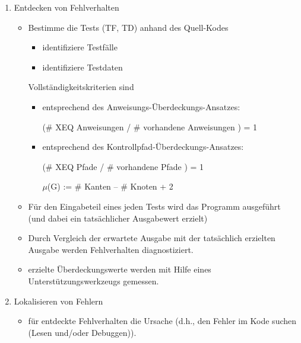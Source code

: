 \begin{enumerate}

\item Entdecken von Fehlverhalten

\begin{itemize}

\item Bestimme die Tests (TF, TD) anhand des Quell-Kodes
\begin{itemize}
\item identifiziere Testf\"alle
\item identifiziere Testdaten
\end{itemize}

Vollst\"andigkeitskriterien sind

\begin{itemize}
\item entsprechend des Anweisungs-\"Uberdeckungs-Ansatzes:

(\# XEQ Anweisungen / \# vorhandene Anweisungen ) =  1

\item entsprechend des Kontrollpfad-\"Uberdeckungs-Ansatzes:

(\# XEQ Pfade / \# vorhandene Pfade ) = 1

$\mu$(G) := \# Kanten -- \# Knoten + 2

\end{itemize}

\item F\"ur den Eingabeteil eines jeden Tests wird das Programm
ausgef\"uhrt (und dabei ein tats\"achlicher Ausgabewert erzielt)

\item Durch Vergleich der erwartete Ausgabe mit der tats\"achlich
erzielten Ausgabe werden Fehlverhalten diagnostiziert.

\item erzielte \"Uberdeckungswerte werden mit Hilfe eines
Unterst\"utzungswerkzeugs gemessen.

\end{itemize}


\item Lokalisieren von Fehlern

\begin{itemize}

\item f\"ur entdeckte Fehlverhalten die Ursache (d.h., den Fehler im
Kode suchen (Lesen und/oder Debuggen)).

\end{itemize}

\end{enumerate}

